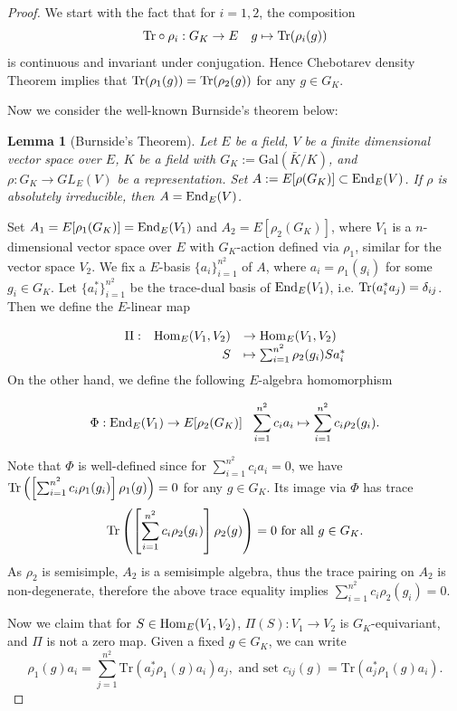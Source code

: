 \documentclass[20pt, oneside]{article}   	%
\newtheorem{lem}[thm]{Lemma}
\theoremstyle{definition}
\newcommand{\Gal}{\mathrm{Gal}}
\begin{document}
\begin{proof}

We start with the fact that for $i=1,2$,  the composition $${\rm Tr}\circ \rho_i: G_K\rightarrow E\ \ \ g\mapsto {\rm Tr}(\rho_i(g))$$ is
continuous and invariant under conjugation. Hence Chebotarev density Theorem implies that ${\rm Tr}(\rho_1(g))={\rm Tr}(\rho_2(g))$ for any $g\in G_K$.




Now we consider the well-known Burnside's theorem below:
\begin{lem}[Burnside's Theorem]
Let $E$ be a field, $V$ be a finite dimensional vector space over $E$, $K$ be a  field with $G_K:=\Gal(\bar{K}/K)$, and $\rho:G_K\rightarrow GL_E(V)$ be a representation. Set $A:=E[\rho(G_K)]\subset {\rm End}_E(V)$. If $\rho$ is absolutely irreducible, then $A={\rm End}_E(V)$.
\end{lem}

Set $A_1=E[\rho_1(G_K)]={\rm End}_E(V_1)$ and $A_2=E[\rho_2(G_K)]$, where $V_1$ is a $n$-dimensional vector space over $E$ with $G_K$-action defined via $\rho_1$, similar for the vector space $V_2$. We fix a $E$-basis $\{a_i\}_{i=1}^{n^2}$ of $A$, where $a_i=\rho_1(g_i)$ for some $g_i\in G_K$. Let $\{a_i^*\}_{i=1}^{n^2}$ be the trace-dual basis of ${\rm End}_E(V_1)$, i.e. ${\rm Tr}(a_i^*a_j)=\delta_{ij}$. Then we define the $E$-linear map

$$
\begin{array}{lrl}
\Pi:&{\rm Hom}_E(V_1,V_2)&\rightarrow {\rm Hom}_E(V_1,V_2)\\
&S& \mapsto \sum_{i=1}^{n^2}\rho_2(g_i)Sa_i^*
\end{array}
$$
On the other hand, we define the following $E$-algebra homomorphism

$$\Phi:{\rm End}_E(V_1)\rightarrow E[\rho_2(G_K)]\ \ \sum_{i=1}^{n^2} c_ia_i\mapsto \sum_{i=1}^{n^2}c_i\rho_2(g_i).$$

Note that $\Phi$ is well-defined since for $\sum_{i=1}^{n^2}c_ia_i=0$, we have  ${\rm Tr}\left(\left [\sum_{i=1}^{n^2}c_i \rho_1(g_i)\right ]\rho_1(g)\right)=0$ for any $g\in G_K$. Its image via $\Phi$ has trace 
$${\rm Tr}\left(\left [\sum_{i=1}^{n^2}c_i \rho_2(g_i)\right ]\rho_2(g)\right)=0 \textrm{ for all $g\in G_K$}.$$ 
As $\rho_2$ is semisimple, $A_2$ is a semisimple algebra, thus the trace pairing on $A_2$ is non-degenerate, therefore the above trace equality implies $\sum_{i=1}^{n^2}c_i \rho_2(g_i)=0$. 



Now we claim that for $S\in {\rm Hom}_E(V_1,V_2)$, $\Pi(S):V_1\rightarrow V_2$ is $G_K$-equivariant, and $\Pi$ is not a zero map. Given a fixed $g\in G_K$, we can write 
\begin{equation}
\rho_1(g) a_i = \sum_{j=1}^{n^2} \text{Tr}(a_j^* \rho_1(g) a_i) a_j \tag{1}, \textrm{ and set }c_{ij}(g)=\text{Tr}(a_j^* \rho_1(g) a_i).\end{equation}


\end{proof}
\end{document}
